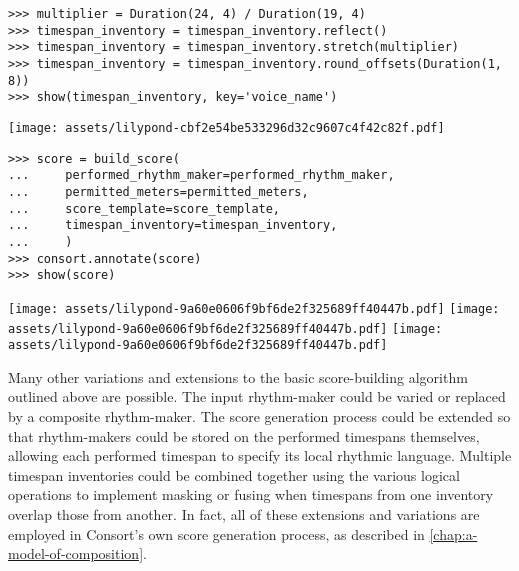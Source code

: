 \begin{abjadbookoutput}
\begin{singlespacing}
\vspace{-0.5\baselineskip}
\begin{verbatim}
>>> multiplier = Duration(24, 4) / Duration(19, 4)
>>> timespan_inventory = timespan_inventory.reflect()
>>> timespan_inventory = timespan_inventory.stretch(multiplier)
>>> timespan_inventory = timespan_inventory.round_offsets(Duration(1, 8))
>>> show(timespan_inventory, key='voice_name')
\end{verbatim}
\noindent\texttt{[image: assets/lilypond-cbf2e54be533296d32c9607c4f42c82f.pdf]}
\begin{verbatim}
>>> score = build_score(
...     performed_rhythm_maker=performed_rhythm_maker,
...     permitted_meters=permitted_meters,
...     score_template=score_template,
...     timespan_inventory=timespan_inventory,
...     )
>>> consort.annotate(score)
>>> show(score)
\end{verbatim}
\noindent\texttt{[image: assets/lilypond-9a60e0606f9bf6de2f325689ff40447b.pdf]}
\newline
\newline
\noindent\texttt{[image: assets/lilypond-9a60e0606f9bf6de2f325689ff40447b.pdf]}
\newline
\newline
\noindent\texttt{[image: assets/lilypond-9a60e0606f9bf6de2f325689ff40447b.pdf]}
\end{singlespacing}
\end{abjadbookoutput}

\noindent Many other variations and extensions to the basic score-building
algorithm outlined above are possible. The input rhythm-maker could be varied
or replaced by a composite rhythm-maker. The score generation process could be
extended so that rhythm-makers could be stored on the performed timespans
themselves, allowing each performed timespan to specify its local rhythmic
language. Multiple timespan inventories could be combined together using the
various logical operations to implement masking or fusing when timespans from
one inventory overlap those from another. In fact, all of these extensions and
variations are employed in Consort's own score generation process, as described
in \autoref{chap:a-model-of-composition}.